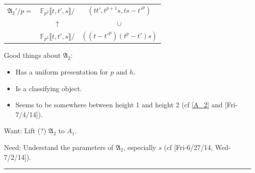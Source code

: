 \documentclass{rs}
\theoremstyle{definition}
\theoremstyle{remark}
\newcommand{\mb}[1]{\mathbb{#1}}
\newcommand{\mf}[1]{\mathfrak{#1}}
\newcommand{\BF}{{\mb F}}
\newcommand{\lb}{\llbracket}
\newcommand{\rb}{\rrbracket}
\renewcommand{\=}{\approx}
\renewcommand{\-}{\sim}
\numberwithin{equation}{section}
\numberwithin{thm}{section}
\begin{document}
\begin{tabular}{ccc}
 ${\mf A_2'} / p = $ & $\BF_{p^2} \lb t, t', s \rb /$ & $(t t', t^{p+1} s, t s - t'^p)$ \\
 & $\uparrow$ & $\cup$ \\
 & $\BF_{p^2} \lb t, t', s \rb /$ & $((t - t'^p) (t^p - t') s)$ 
\end{tabular}

Good things about $\mf A_2$: 
\begin{itemize}
 \item Has a uniform presentation for $p$ and $h$.  

 \item Is a classifying object.  

 \item Seems to be somewhere between height 1 and height 2 (cf \eqref{A_2} and [Fri-7/4/14]).  
\end{itemize}

Want: Lift (?) $\mf A_2$ to $A_1$.  

Need: Understand the parameters of $\mf A_2$, especially $s$ (cf [Fri-6/27/14, Wed-7/2/14]).  \\

\hrule
\end{document}
